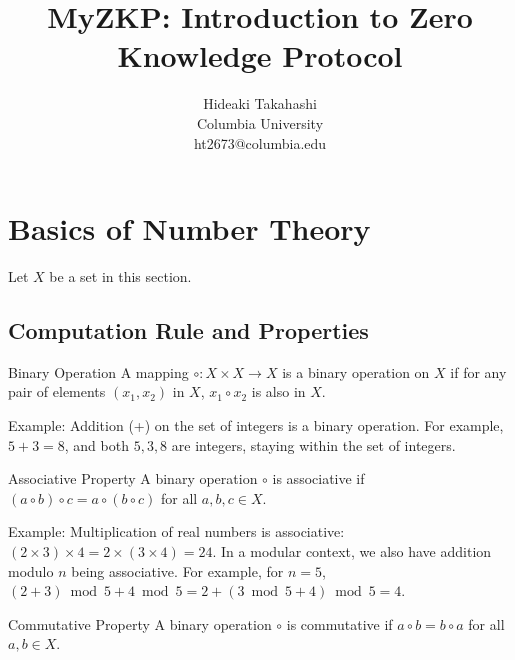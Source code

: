 \documentclass{article}
\title{MyZKP: Introduction to Zero Knowledge Protocol
}
\author{
    Hideaki Takahashi \\
    Columbia University \\
    ht2673@columbia.edu
}
\begin{document}
\maketitle






\section{Basics of Number Theory}

Let $X$ be a set in this section.

\subsection{Computation Rule and Properties}

\begin{definition}{Binary Operation}{}
A mapping $\circ: X \times X \rightarrow X$ is a binary operation on $X$ if for any pair of elements $(x_1, x_2)$ in $X$, $x_1 \circ x_2$ is also in $X$.
\end{definition}

Example: Addition (+) on the set of integers is a binary operation. For example, $5 + 3 = 8$, and both $5, 3, 8$ are integers, staying within the set of integers.

\begin{definition}{Associative Property}{}
A binary operation $\circ$ is associative if $(a \circ b) \circ c = a \circ (b \circ c)$ for all $a, b, c \in X$.
\end{definition}

Example: Multiplication of real numbers is associative: $(2 \times 3) \times 4 = 2 \times (3 \times 4) = 24$. In a modular context, we also have addition modulo $n$ being associative. For example, for $n = 5$, $(2 + 3) \bmod 5 + 4 \bmod 5 = 2 + (3 \bmod 5 + 4) \bmod 5 = 4$.

\begin{definition}{Commutative Property}{}
A binary operation $\circ$ is commutative if $a \circ b = b \circ a$ for all $a, b \in X$.
\end{definition}
\end{document}
